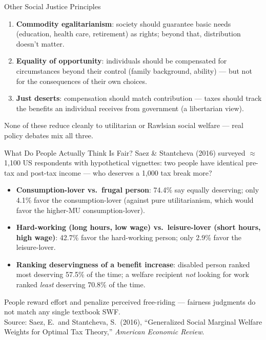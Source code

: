 \documentclass[11pt,aspectratio=169]{beamer}
\newcommand{\srcnote}[1]{{\footnotesize\color{wugray}Source: #1}}
\begin{document}
\begin{frame}{Other Social Justice Principles}
  \begin{enumerate}
    \item \textbf{Commodity egalitarianism}: society should guarantee basic needs (education, health care, retirement) as rights; beyond that, distribution doesn't matter.
    \item \textbf{Equality of opportunity}: individuals should be compensated for circumstances beyond their control (family background, ability) --- but not for the consequences of their own choices.
    \item \textbf{Just deserts}: compensation should match contribution --- taxes should track the benefits an individual receives from government (a libertarian view).
  \end{enumerate}
  \vspace{0.3em}
  \centering \small
  None of these reduce cleanly to utilitarian or Rawlsian social welfare --- real policy debates mix all three.
\end{frame}

\begin{frame}{What Do People Actually Think Is Fair?}
  \footnotesize
  Saez \& Stantcheva (2016) surveyed \(\approx\)1{,}100 US respondents with hypothetical vignettes: two people have identical pre-tax and post-tax income --- who deserves a \texteuro{}1{,}000 tax break more?
  \begin{itemize}
  \setlength{\itemsep}{2pt}
    \item \textbf{Consumption-lover vs.\ frugal person}: 74.4\% say equally deserving; only 4.1\% favor the consumption-lover (against pure utilitarianism, which would favor the higher-MU consumption-lover).
    \item \textbf{Hard-working (long hours, low wage) vs.\ leisure-lover (short hours, high wage)}: 42.7\% favor the hard-working person; only 2.9\% favor the leisure-lover.
    \item \textbf{Ranking deservingness of a benefit increase}: disabled person ranked most deserving 57.5\% of the time; a welfare recipient \emph{not} looking for work ranked \emph{least} deserving 70.8\% of the time.
  \end{itemize}
  \centering
  People reward effort and penalize perceived free-riding --- fairness judgments do not match any single textbook SWF.\\
  \srcnote{Saez, E.\ and Stantcheva, S.\ (2016), ``Generalized Social Marginal Welfare Weights for Optimal Tax Theory,'' \emph{American Economic Review}.}
\end{frame}
\end{document}
